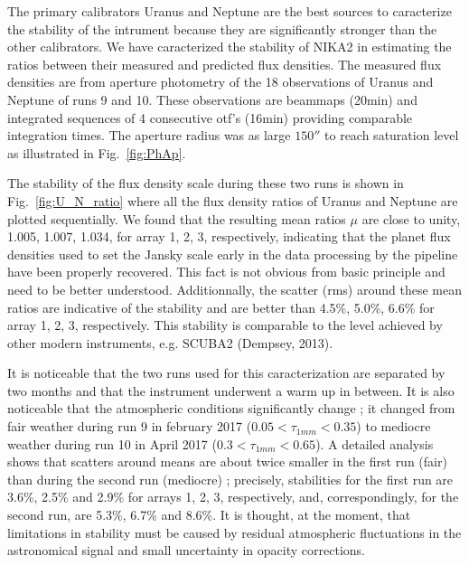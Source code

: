 The primary calibrators Uranus and Neptune are the best sources to caracterize the stability of the intrument
because they are significantly stronger than the other calibrators.
We have caracterized the stability of NIKA2  in estimating the ratios between their measured 
and predicted flux densities. The measured flux densities are from aperture photometry of the
18 observations  of Uranus and Neptune of runs 9 and 10. These observations are   beammaps  (20min) and integrated sequences of 4 consecutive otf's 
(16min) providing comparable integration times. The aperture radius was as large $150''$ to reach saturation level
as illustrated in Fig.~\ref{fig:PhAp}. 

The stability of the flux density scale during these two runs 
is shown  in  Fig.~\ref{fig:U_N_ratio}  where all the flux density ratios of Uranus and Neptune are
plotted sequentially.
We found that the resulting mean ratios $\mu$ are close to unity,  1.005, 1.007, 1.034, for array 1, 2, 3, respectively,
indicating that the planet flux densities used to set the Jansky scale 
early in the data processing by the pipeline have been properly recovered. This fact is not obvious from basic principle and need to be better
understood. Additionnally, the scatter (rms) around these mean ratios are indicative of
the stability and are better than 4.5\%, 5.0\%, 6.6\% for array 1, 2, 3,
respectively. This stability is comparable to the level achieved by other modern instruments,
e.g. SCUBA2 (Dempsey, 2013).

It is noticeable that the two runs used for this caracterization  are
separated by two months and that the instrument underwent a warm up in between. It is also noticeable that the
atmospheric conditions significantly change ; it changed from fair weather during run 9 in february 2017
($0.05 < \tau_{1mm} < 0.35$) to mediocre weather during run 10 in April 2017 ($0.3 < \tau_{1mm} < 0.65$). 
A detailed analysis shows that scatters around means 
are about twice smaller in the first run (fair) than during the second run (mediocre) ;
precisely, stabilities for the first run
are 3.6\%, 2.5\% and 2.9\% for arrays 1, 2, 3, respectively,
and, correspondingly, for the second run, are  5.3\%, 6.7\% and 8.6\%.
It is thought, at the moment, that limitations in stability must be  caused by residual atmospheric fluctuations
in the astronomical signal and small uncertainty in opacity corrections.

